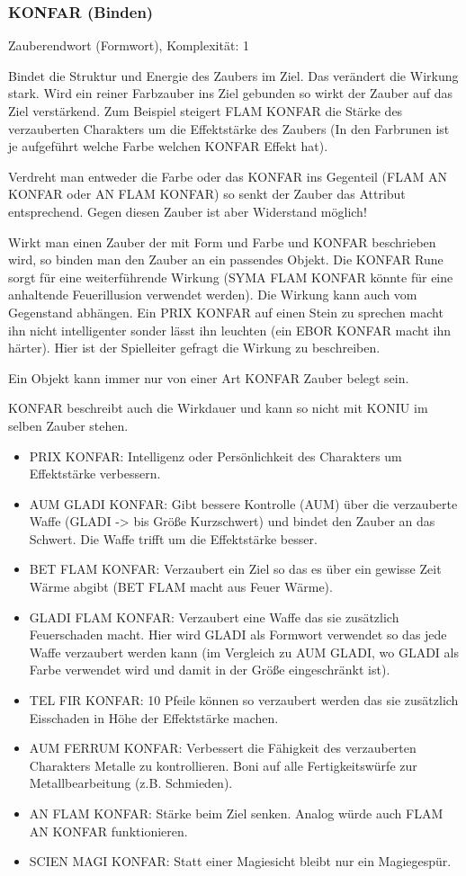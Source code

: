 \documentclass{article}
\begin{document}
\subsubsection{KONFAR (Binden)}

Zauberendwort (Formwort), Komplexität: 1

Bindet die Struktur und Energie des Zaubers im Ziel. Das verändert die Wirkung stark. Wird ein reiner Farbzauber ins
Ziel gebunden so wirkt der Zauber auf das Ziel verstärkend. Zum Beispiel steigert FLAM KONFAR die Stärke des
verzauberten Charakters um die Effektstärke des Zaubers (In den Farbrunen ist je aufgeführt welche Farbe welchen
KONFAR Effekt hat).

Verdreht man entweder die Farbe oder das KONFAR ins Gegenteil (FLAM AN KONFAR oder AN FLAM KONFAR) so senkt der Zauber
das Attribut entsprechend. Gegen diesen Zauber ist aber Widerstand möglich!

Wirkt man einen Zauber der mit Form und Farbe und KONFAR beschrieben wird, so binden man den Zauber an ein passendes
Objekt. Die KONFAR Rune sorgt für eine weiterführende Wirkung (SYMA FLAM KONFAR könnte für eine anhaltende
Feuerillusion verwendet werden). Die Wirkung kann auch vom Gegenstand abhängen. Ein PRIX KONFAR auf einen Stein zu
sprechen macht ihn nicht intelligenter sonder lässt ihn leuchten (ein EBOR KONFAR macht ihn härter). Hier ist der
Spielleiter gefragt die Wirkung zu beschreiben.

Ein Objekt kann immer nur von einer Art KONFAR Zauber belegt sein.

KONFAR beschreibt auch die Wirkdauer und kann so nicht mit KONIU im selben Zauber stehen.

\begin{itemize}
\item PRIX KONFAR: Intelligenz oder Persönlichkeit des Charakters um Effektstärke verbessern.
\item AUM GLADI KONFAR: Gibt bessere Kontrolle (AUM) über die verzauberte Waffe (GLADI -> bis Größe Kurzschwert) und bindet den Zauber an das Schwert. Die Waffe trifft um die Effektstärke besser.
\item BET FLAM KONFAR: Verzaubert ein Ziel so das es über ein gewisse Zeit Wärme abgibt (BET FLAM macht aus Feuer Wärme).
\item GLADI FLAM KONFAR: Verzaubert eine Waffe das sie zusätzlich Feuerschaden macht. Hier wird GLADI als Formwort verwendet so das jede Waffe verzaubert werden kann (im Vergleich zu AUM GLADI, wo GLADI als Farbe verwendet wird und damit in der Größe eingeschränkt ist).
\item TEL FIR KONFAR: 10 Pfeile können so verzaubert werden das sie zusätzlich Eisschaden in Höhe der Effektstärke machen.
\item AUM FERRUM KONFAR: Verbessert die Fähigkeit des verzauberten Charakters Metalle zu kontrollieren. Boni auf alle Fertigkeitswürfe zur Metallbearbeitung (z.B. Schmieden).
\item AN FLAM KONFAR: Stärke beim Ziel senken. Analog würde auch FLAM AN KONFAR funktionieren.
\item SCIEN MAGI KONFAR: Statt einer Magiesicht bleibt nur ein Magiegespür.
\end{itemize}
\end{document}
